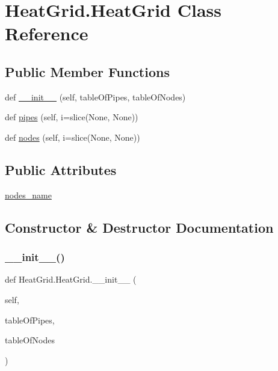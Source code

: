 \hypertarget{class_heat_grid_1_1_heat_grid}{}\section{Heat\+Grid.\+Heat\+Grid Class Reference}
\label{class_heat_grid_1_1_heat_grid}
\subsection*{Public Member Functions}
\begin{DoxyCompactItemize}
\item 
def \hyperlink{class_heat_grid_1_1_heat_grid_a27cb2e55814a70836bfa545444e9e5bd}{\+\_\+\+\_\+init\+\_\+\+\_\+} (self, table\+Of\+Pipes, table\+Of\+Nodes)
\item 
def \hyperlink{class_heat_grid_1_1_heat_grid_af17f7454a1291bba202b45f49f62a483}{pipes} (self, i=slice(None, None))
\item 
def \hyperlink{class_heat_grid_1_1_heat_grid_aee9b2652e4a04ae68e3e2c4779364dda}{nodes} (self, i=slice(None, None))
\end{DoxyCompactItemize}
\subsection*{Public Attributes}
\begin{DoxyCompactItemize}
\item 
\hyperlink{class_heat_grid_1_1_heat_grid_a3611b66c8dfdfdd3e94db12e76cfe9b7}{nodes\+\_\+name}
\end{DoxyCompactItemize}


\subsection{Constructor \& Destructor Documentation}
\mbox{\label{class_heat_grid_1_1_heat_grid_a27cb2e55814a70836bfa545444e9e5bd}} 
\subsubsection{\texorpdfstring{\+\_\+\+\_\+init\+\_\+\+\_\+()}{\_\_init\_\_()}}
{\footnotesize\ttfamily def Heat\+Grid.\+Heat\+Grid.\+\_\+\+\_\+init\+\_\+\+\_\+ (\begin{DoxyParamCaption}\item[{}]{self,  }\item[{}]{table\+Of\+Pipes,  }\item[{}]{table\+Of\+Nodes }\end{DoxyParamCaption})}

